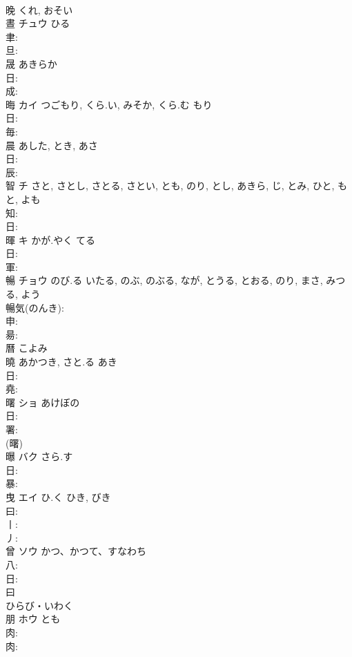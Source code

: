 \documentclass[8pt]{extreport}
\begin{document}
\begin{CJK}{UTF8}{min}
\\	晚		くれ, おそい				
\\	晝	チュウ	ひる				
\\	聿: 
\\	旦: 
\\	晟		あきらか				
\\	日: 
\\	成: 
\\	晦	カイ	つごもり, くら.い, みそか, くら.む	もり	
\\	日: 
\\	毎: 
\\	晨		あした, とき, あさ				
\\	日: 
\\	辰: 
\\	智	チ		さと, さとし, さとる, さとい, とも, のり, とし, あきら, じ, とみ, ひと, もと, よも	
\\	知: 
\\	日: 
\\	暉	キ	かが.やく	てる	
\\	日: 
\\	軍: 
\\	暢	チョウ	のび.る	いたる, のぶ, のぶる, なが, とうる, とおる, のり, まさ, みつる, よう	
\\	暢気(のんき): 
\\	申: 
\\	昜: 
\\	曆		こよみ				
\\	曉		あかつき, さと.る	あき			
\\	日: 
\\	堯: 
\\	曙	ショ	あけぼの		
\\	日: 
\\	署: 
\\	(曙) 
\\	曝	バク	さら.す		
\\	日: 
\\	暴: 
\\	曳	エイ	ひ.く	ひき, びき	
\\	曰: 
\\	丨: 
\\	丿: 
\\	曾	ソウ	かつ、かつて、すなわち		
\\	八: 
\\	日: 
\\	曰	
\\	ひらび・いわく	
\\	朋	ホウ	とも		
\\	肉: 
\\	肉: 

\end{CJK}
\end{document}
